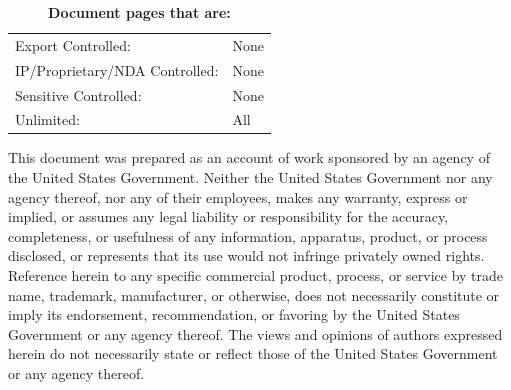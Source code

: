 \begin{titlepage}
   \vspace*{\fill}
   
   
   \begin{table}[H]
   \caption*{\Large\bfseries{Document pages that are:}}
   \centering
   \begin{tabular}{ll}
   Export Controlled: & None \\
   IP/Proprietary/NDA Controlled: & None \\
   Sensitive Controlled: & None \\
   Unlimited: & All \\
   \end{tabular}
   \end{table}
   
   \vspace*{\fill}
   
   This document was prepared as an account of work sponsored by an agency of the United States Government. Neither the United States Government nor any agency thereof, nor any of their employees, makes any warranty, express or implied, or assumes any legal liability or responsibility for the accuracy, completeness, or usefulness of any information, apparatus, product, or process disclosed, or represents that its use would not infringe privately owned rights. Reference herein to any specific commercial product, process, or service by trade name, trademark, manufacturer, or otherwise, does not necessarily constitute or imply its endorsement, recommendation, or favoring by the United States Government or any agency thereof. The views and opinions of authors expressed herein do not necessarily state or reflect those of the United States Government or any agency thereof.

   \captionsetup{justification=justified}
   
   \vspace*{\fill}
   
   \newpage

\end{titlepage}
